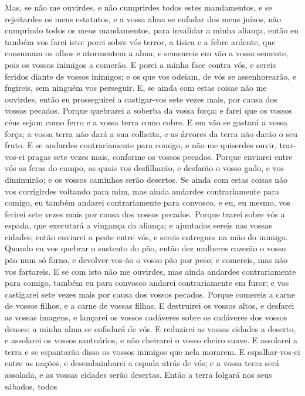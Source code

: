 Mas, se não me ouvirdes, e não cumprirdes todos estes
mandamentos, e se rejeitardes os meus estatutos, e a vossa
alma se enfadar dos meus juízos, não cumprindo todos os meus
mandamentos, para invalidar a minha aliança, então eu também
vos farei isto: porei sobre vós terror, a tísica e a febre ardente,
que consumam os olhos e atormentem a alma; e semeareis em vão a
vossa semente, pois os vossos inimigos a comerão. E porei a
minha face contra vós, e sereis feridos diante de vossos inimigos; e
os que vos odeiam, de vós se assenhorearão, e fugireis, sem ninguém
vos perseguir. E, se ainda com estas coisas não me ouvirdes,
então eu prosseguirei a castigar-vos sete vezes mais, por causa dos
vossos pecados. Porque quebrarei a soberba da vossa força; e
farei que os vossos céus sejam como ferro e a vossa terra como
cobre. E em vão se gastará a vossa força; a vossa terra não
dará a sua colheita, e as árvores da terra não darão o seu fruto.
E se andardes contrariamente para comigo, e não me quiserdes
ouvir, trar-vos-ei pragas sete vezes mais, conforme os vossos
pecados. Porque enviarei entre vós as feras do campo, as
quais vos desfilharão, e desfarão o vosso gado, e vos diminuirão; e
os vossos caminhos serão desertos. Se ainda com estas coisas
não vos corrigirdes voltando para mim, mas ainda andardes
contrariamente para comigo, eu também andarei contrariamente
para convosco, e eu, eu mesmo, vos ferirei sete vezes mais por causa
dos vossos pecados. Porque trarei sobre vós a espada, que
executará a vingança da aliança; e ajuntados sereis nas vossas
cidades; então enviarei a peste entre vós, e sereis entregues na mão
do inimigo. Quando eu vos quebrar o sustento do pão, então
dez mulheres cozerão o vosso pão num só forno, e devolver-vos-ão o
vosso pão por peso; e comereis, mas não vos fartareis. E se
com isto não me ouvirdes, mas ainda andardes contrariamente para
comigo, também eu para convosco andarei contrariamente em
furor; e vos castigarei sete vezes mais por causa dos vossos
pecados. Porque comereis a carne de vossos filhos, e a carne
de vossas filhas. E destruirei os vossos altos, e desfarei as
vossas imagens, e lançarei os vossos cadáveres sobre os cadáveres
dos vossos deuses; a minha alma se enfadará de vós. E
reduzirei as vossas cidades a deserto, e assolarei os vossos
santuários, e não cheirarei o vosso cheiro suave. E assolarei
a terra e se espantarão disso os vossos inimigos que nela morarem.
E espalhar-vos-ei entre as nações, e desembainharei a espada
atrás de vós; e a vossa terra será assolada, e as vossas cidades
serão desertas. Então a terra folgará nos seus sábados, todos
